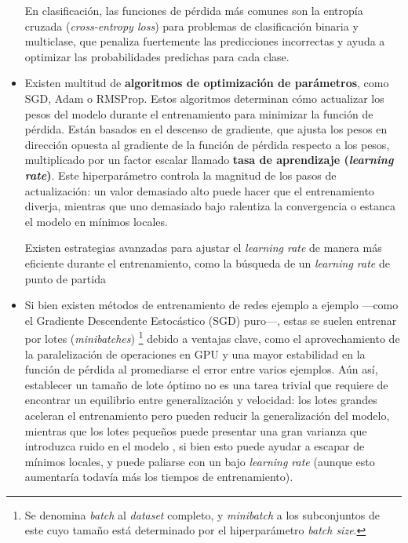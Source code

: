 \begin{itemize}
    En clasificación, las funciones de pérdida más comunes son la entropía cruzada (\textit{cross-entropy 
    loss}) para problemas de clasificación binaria y multiclase, que penaliza fuertemente las predicciones 
    incorrectas y ayuda a optimizar las probabilidades predichas para cada clase.


    \item Existen multitud de \textbf{algoritmos de optimización de parámetros}, como SGD, Adam o RMSProp. 
    Estos algoritmos determinan cómo actualizar los pesos del modelo durante el entrenamiento para minimizar 
    la función de pérdida. 
    Están basados en el descenso de gradiente, que ajusta los pesos en dirección opuesta al gradiente de 
    la función de pérdida respecto a los pesos, multiplicado por un factor escalar llamado \textbf{tasa 
    de aprendizaje (\textit{learning rate})}. Este hiperparámetro controla la magnitud de los pasos de 
    actualización: un valor demasiado alto puede hacer que el entrenamiento diverja, mientras que uno 
    demasiado bajo ralentiza la convergencia o estanca el modelo en mínimos locales.

    Existen estrategias avanzadas para ajustar el \textit{learning rate} de manera más eficiente durante el 
    entrenamiento, como la búsqueda de un \textit{learning rate} de punto de partida 


    \item Si bien existen métodos de entrenamiento de redes ejemplo a ejemplo ---como el Gradiente Descendente 
    Estocástico (SGD) puro\cite{bottou2010}---, estas se suelen entrenar por lotes 
    (\textit{minibatches})
    \footnote{
        Se denomina \textit{batch} al \textit{dataset} completo, y \textit{minibatch} a los subconjuntos de
        este cuyo tamaño está determinado por el hiperparámetro \textit{batch size}.
    } 
    debido a ventajas clave, como el aprovechamiento de la paralelización de operaciones en GPU y una mayor 
    estabilidad en la función de pérdida al promediarse el error entre varios ejemplos. 
    Aún así, establecer un tamaño de lote óptimo no es una tarea trivial que requiere de encontrar un 
    equilibrio entre generalización y velocidad: los lotes grandes aceleran el entrenamiento pero pueden 
    reducir la generalización del modelo, mientras que los lotes pequeños puede presentar una gran varianza 
    que introduzca ruido en el modelo \cite{keskar2017}, si bien esto puede ayudar a escapar de mínimos 
    locales, y puede paliarse con un bajo \textit{learning rate} (aunque esto aumentaría todavía más los 
    tiempos de entrenamiento).
    


\end{itemize}

